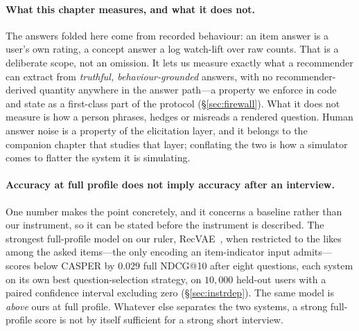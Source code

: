 \documentclass[11pt]{article}
\begin{document}
\paragraph{What this chapter measures, and what it does not.}
The answers folded here come from recorded behaviour: an item answer is a user's own rating, a concept answer a
log watch-lift over raw counts. That is a deliberate scope, not an omission. It lets us measure exactly what a
recommender can extract from \emph{truthful, behaviour-grounded} answers, with no recommender-derived quantity
anywhere in the answer path---a property we enforce in code and state as a first-class part of the protocol
(\S\ref{sec:firewall}). What it does not measure is how a person phrases, hedges or misreads a rendered question.
Human answer noise is a property of the elicitation layer, and it belongs to the companion chapter that studies
that layer; conflating the two is how a simulator comes to flatter the system it is simulating.

\paragraph{Accuracy at full profile does not imply accuracy after an interview.} One number makes the point
concretely, and it concerns a baseline rather than our instrument, so it can be stated before the instrument is
described. The strongest full-profile model on our ruler, RecVAE~\cite{ren2020recvae}, when restricted to the
likes among the asked items---the only encoding an item-indicator input admits---scores below CASPER by
$0.029$ full NDCG@10 after eight questions, each system on its own best question-selection strategy, on
$10{,}000$ held-out users with a paired confidence interval excluding zero (\S\ref{sec:instrdep}). The same model
is \emph{above} ours at full profile. Whatever else separates the two systems, a strong full-profile score is not
by itself sufficient for a strong short interview.
\end{document}
